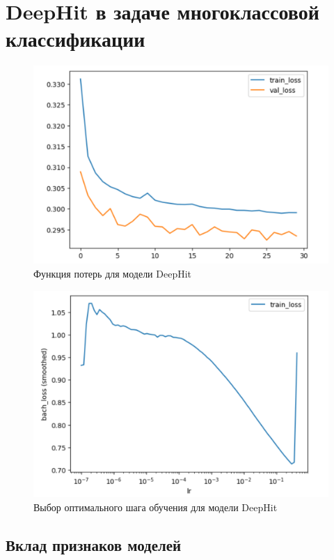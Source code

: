 \documentclass[a4paper,14pt,oneside,openany]{memoir}
\begin{document}
\section{DeepHit в задаче многоклассовой классификации}

\begin{figure}[H]
	\includegraphics[width=\textwidth]{../figures/deephit_losses_30_epoch.png}
	\caption{Функция потерь для модели DeepHit}
\end{figure}

\begin{figure}[H]
	\includegraphics[width=\textwidth]{../figures/deephit_losses_30_epoch_lr.png}
	\caption{Выбор оптимального шага обучения для модели DeepHit}
\end{figure}

\subsection{Вклад признаков моделей}
\end{document}
